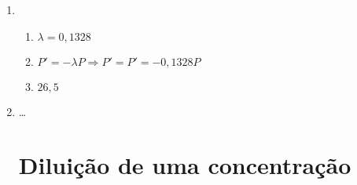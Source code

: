 \documentclass[a4paper]{article}
\begin{document}
\begin{enumerate}


\item 
  \begin{enumerate}
  \item $\lambda = 0,1328$
  \item $P' = -\lambda P \Rightarrow P' = P' = -0,1328 P$
  \item $26,5$
  \end{enumerate}




\item \ldots

\section{Diluição de uma concentração}


\end{enumerate}
\end{document}
